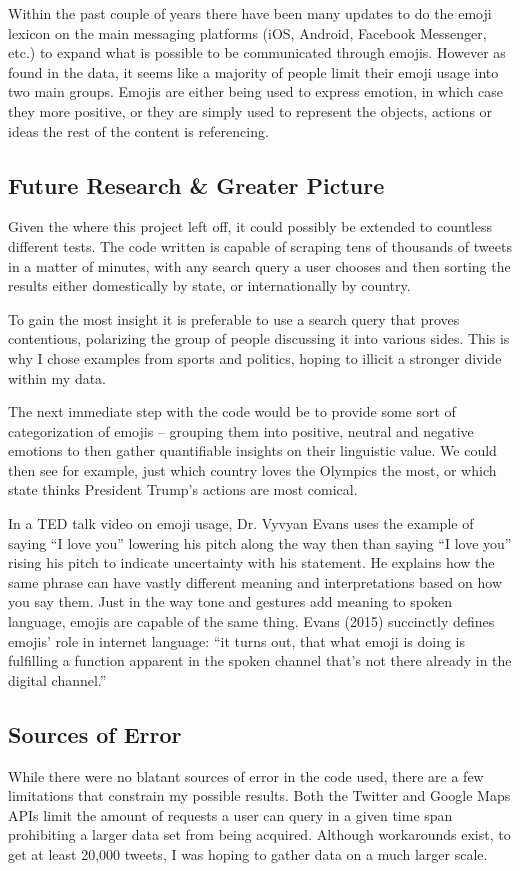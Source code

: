 \documentclass[a4paper,12pt]{article}
\begin{document}
Within the past couple of years there have been many updates to do the emoji lexicon on the main messaging platforms (iOS, Android, Facebook Messenger, etc.) to expand what is possible to be communicated through emojis. However as found in the data, it seems like a majority of people limit their emoji usage into two main groups. Emojis are either being used to express emotion, in which case they more positive, or they are simply used to represent the objects, actions or ideas the rest of the content is referencing. 

\subsection{Future Research \& Greater Picture}
Given the where this project left off, it could possibly be extended to countless different tests. The code written is capable of scraping tens of thousands of tweets in a matter of minutes, with any search query a user chooses and then sorting the results either domestically by state, or internationally by country. 

To gain the most insight it is preferable to use a search query that proves contentious, polarizing the group of people discussing it into various sides. This is why I chose examples from sports and politics, hoping to illicit a stronger divide within my data. 

The next immediate step with the code would be to provide some sort of categorization of emojis – grouping them into positive, neutral and negative emotions to then gather quantifiable insights on their linguistic value. We could then see for example, just which country loves the Olympics the most, or which state thinks President Trump’s actions are most comical. 

In a TED talk video on emoji usage, Dr. Vyvyan Evans uses the example of saying “I love you” lowering his pitch along the way then than saying “I love you” rising his pitch to indicate uncertainty with his statement. He explains how the same phrase can have vastly different meaning and interpretations based on how you say them. Just in the way tone and gestures add meaning to spoken language, emojis are capable of the same thing. Evans (2015) succinctly defines emojis’ role in internet language: “it turns out, that what emoji is doing is fulfilling a function apparent in the spoken channel that’s not there already in the digital channel.”

\subsection{Sources of Error}
While there were no blatant sources of error in the code used, there are a few limitations that constrain my possible results. Both the Twitter and Google Maps APIs limit the amount of requests a user can query in a given time span prohibiting a larger data set from being acquired. Although workarounds exist, to get at least 20,000 tweets, I was hoping to gather data on a much larger scale. 
\end{document}
